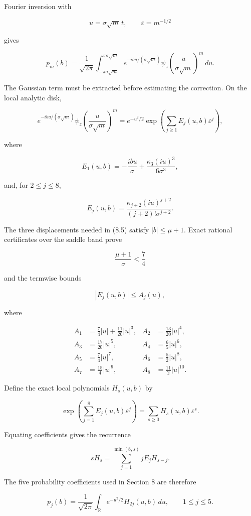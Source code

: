 \documentclass[11pt]{article}
\numberwithin{equation}{section}
\begin{document}
Fourier inversion with

\[
u=\sigma\sqrt m\,t,
\qquad
\varepsilon=m^{-1/2}
\]

gives

\[
\overline p_m(b)=\frac1{\sqrt{2\pi}}
\int_{-\pi\sigma\sqrt m}^{\pi\sigma\sqrt m}
e^{-ibu/(\sigma\sqrt m)}
\psi_z\!\left(\frac{u}{\sigma\sqrt m}\right)^m\,du.
\tag{9.2}
\]

The Gaussian term must be extracted before estimating the correction. On the local
analytic disk,

\[
e^{-ibu/(\sigma\sqrt m)}
\psi_z\!\left(\frac{u}{\sigma\sqrt m}\right)^m
=e^{-u^2/2}
\exp\left(\sum_{j\ge1}E_j(u,b)\varepsilon^j\right),
\tag{9.3}
\]

where

\[
E_1(u,b)=-\frac{ibu}{\sigma}+\frac{\kappa_3(iu)^3}{6\sigma^3},
\]

and, for $2\le j\le8$,

\[
E_j(u,b)=\frac{\kappa_{j+2}(iu)^{j+2}}{(j+2)!\sigma^{j+2}}.
\tag{9.4}
\]

The three displacements needed in (8.5) satisfy $|b|\le\mu+1$. Exact rational
certificates over the saddle band prove

\[
\frac{\mu+1}{\sigma}<\frac74
\]

and the termwise bounds

\[
|E_j(u,b)|\le A_j(u),
\tag{9.5}
\]

where

\[
\begin{aligned}
A_1&=\frac74|u|+\frac{11}{20}|u|^3,&
A_2&=\frac{13}{20}|u|^4,\\
A_3&=\frac{17}{20}|u|^5,&
A_4&=\frac65|u|^6,\\
A_5&=\frac74|u|^7,&
A_6&=\frac52|u|^8,\\
A_7&=\frac{15}{4}|u|^9,&
A_8&=\frac{11}{2}|u|^{10}.
\end{aligned}
\tag{9.6}
\]

Define the exact local polynomials $H_s(u,b)$ by

\[
\exp\left(\sum_{j=1}^{8}E_j(u,b)\varepsilon^j\right)
=\sum_{s\ge0}H_s(u,b)\varepsilon^s.
\]

Equating coefficients gives the recurrence

\[
sH_s=\sum_{j=1}^{\min(8,s)}jE_jH_{s-j}.
\tag{9.7}
\]

The five probability coefficients used in Section 8 are therefore

\[
p_j(b)=\frac1{\sqrt{2\pi}}
\int_{\mathbb R}e^{-u^2/2}H_{2j}(u,b)\,du,
\qquad 1\le j\le5.
\tag{9.8}
\]
\end{document}
